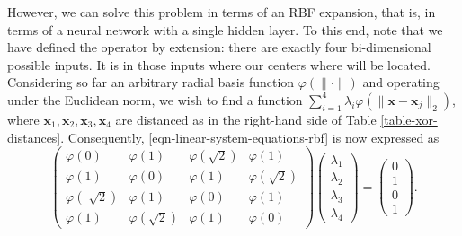 \documentclass[12pt]{report} %
\newcommand{\tmmathbf}[1]{\ensuremath{\boldsymbol{#1}}}
\newcommand{\tmverbatim}[1]{\text{{\ttfamily{#1}}}}
\begin{document}
However, we can solve this problem in terms of an RBF expansion, that is, in
terms of a neural network with a single hidden layer. To this end, note that
we have defined the \tmverbatim{xor} operator by extension: there are exactly
four bi-dimensional possible inputs. It is in those inputs where our centers where will be located.
Considering so far an arbitrary radial basis function $\varphi (\| \cdot \|)$
and operating under the Euclidean norm, we wish to find a function $\sum_{i =
1}^4 \lambda_i \varphi (\| \tmmathbf{x}-\tmmathbf{x}_j \|_2)$, where
$\tmmathbf{x}_1, \tmmathbf{x}_2, \tmmathbf{x}_3, \tmmathbf{x}_4$ are distanced as in the
right-hand side of Table \ref{table-xor-distances}. Consequently,
\eqref{eqn-linear-system-equations-rbf} is now expressed as
\begin{equation}
    \left(\begin{array}{cccc}
     \varphi (0) & \varphi (1) & \varphi \left( \sqrt{2} \right) & \varphi
     (1)\\
     \varphi (1) & \varphi (0) & \varphi (1) & \varphi \left( \sqrt{2}
     \right)\\
     \varphi \left( \sqrt[]{2} \right) & \varphi (1) & \varphi (0) & \varphi
     (1)\\
     \varphi (1) & \varphi \left( \sqrt{2} \right) & \varphi (1) & \varphi (0)
   \end{array}\right) \left(\begin{array}{c}
     \lambda_1\\
     \lambda_2\\
     \lambda_3\\
     \lambda_4
   \end{array}\right) = \left(\begin{array}{c}
     0\\
     1\\
     0\\
     1
   \end{array}\right) .\label{interpolationconditionxor}
\end{equation}
\end{document}
